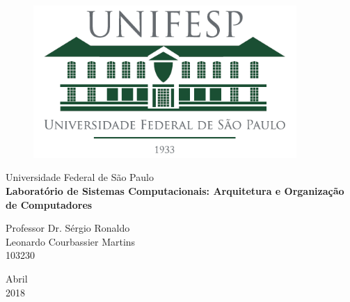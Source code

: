 \documentclass[a4paper, 12pt]{article}
\begin{document}

\begin{titlepage}
	\begin{center}
	
	\begin{figure}[!ht]
	\centering
	\includegraphics[width=10cm]{unifesp.png}
	\end{figure}

		\Huge{Universidade Federal de São Paulo}\\
		\vspace{15pt}
        \vspace{95pt}
        \textbf{\LARGE{Laboratório de Sistemas Computacionais: Arquitetura e Organização de Computadores}}\\
		\vspace{2,5cm}
	\end{center}
	
	\begin{flushleft}
		\begin{tabbing}
			Professor Dr. Sérgio Ronaldo\\
			Leonardo Courbassier Martins\\
			103230
	\end{tabbing}
 \end{flushleft}
	
	\begin{center}
		\vspace{\fill}
			 Abril\\
		 2018
			\end{center}
\end{titlepage}
\tableofcontents

\newpage
\end{document}

